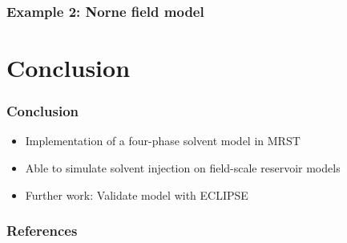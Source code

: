 \documentclass[screen, aspectratio=43]{beamer}
\begin{document}
\begin{frame}
  \frametitle{Example 2: Norne field model}
\end{frame}

\section{Conclusion}

\begin{frame}
  \frametitle{Conclusion}
  \begin{itemize}
  \item Implementation of a four-phase solvent model in MRST
  \item Able to simulate solvent injection on field-scale reservoir models
  \item Further work: Validate model with ECLIPSE
  \end{itemize}
\end{frame}

\begin{frame}
  \frametitle{References}
  \begin{small}
  
\end{small}
\end{frame}
\end{document}

